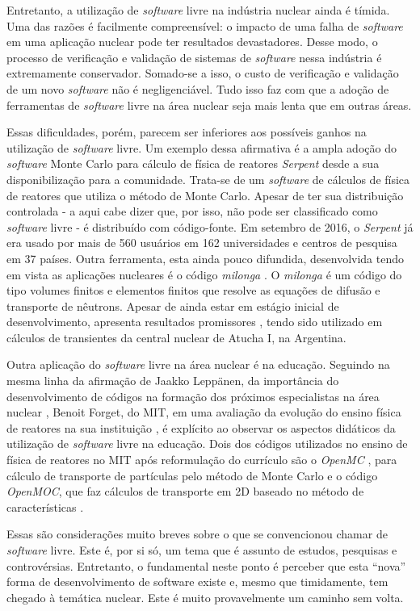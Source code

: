 Entretanto, a utilização de \textit{software} livre na indústria nuclear ainda é tímida.
Uma das razões é facilmente compreensível: o impacto de uma falha de \textit{software}
em uma aplicação nuclear pode ter resultados devastadores. Desse modo, o processo de
verificação e validação de sistemas de \textit{software} nessa indústria é extremamente
conservador. Somado-se a isso, o custo de verificação e validação de um novo \textit{software}
não é negligenciável. Tudo isso faz com que a adoção de ferramentas de \textit{software}
livre na área nuclear seja mais lenta que em outras áreas.

Essas dificuldades, porém, parecem ser inferiores aos possíveis ganhos na utilização de
\textit{software} livre. Um exemplo dessa afirmativa é a ampla adoção
do \textit{software} Monte Carlo para cálculo de física de reatores \textit{Serpent} \cite{Serpent2013}
desde a sua disponibilização para a comunidade. Trata-se de um \textit{software}
de cálculos de física de reatores que utiliza o método de Monte Carlo. Apesar
de ter sua distribuição controlada - a aqui cabe dizer que, por isso, não pode ser
classificado como \textit{software} livre - é distribuído com código-fonte. Em setembro
de 2016, o \textit{Serpent} já era usado por mais de 560 usuários em 162 universidades
e centros de pesquisa em 37 países. Outra ferramenta, esta ainda pouco difundida,
desenvolvida tendo em vista as aplicações nucleares é o código \textit{milonga} \cite{Theler2014b}.
O \textit{milonga} é um código do tipo volumes finitos e elementos finitos que resolve as equações
de difusão e transporte de nêutrons. Apesar de ainda estar em estágio inicial de
desenvolvimento, apresenta resultados promissores \cite{Theler2014}, tendo sido
utilizado em cálculos de transientes da central nuclear de Atucha I, na Argentina.

Outra aplicação do \textit{software} livre na área nuclear é na educação. Seguindo na
mesma linha da afirmação de Jaakko Leppänen, da importância do desenvolvimento de
códigos na formação dos próximos especialistas na área nuclear \cite{Leppanen2015}, Benoit
Forget, do MIT, em uma avaliação da evolução do ensino física de reatores na sua instituição \cite{Forget2014}, é explícito ao observar os aspectos didáticos da
utilização de \textit{software} livre na educação. Dois dos códigos utilizados
no ensino de física de reatores no MIT após reformulação do currículo são o \textit{OpenMC}
\cite{Romano2013}, para cálculo de transporte de partículas pelo método de Monte Carlo e
o código \textit{OpenMOC}, que faz cálculos de transporte em 2D baseado
no método de características \cite{Boyd2014}.

Essas são considerações muito breves sobre o que se convencionou chamar
de \textit{software} livre. Este é, por si só, um tema que é assunto de estudos, pesquisas
e controvérsias. Entretanto, o fundamental neste ponto é perceber que esta ``nova'' forma
de desenvolvimento de software existe e, mesmo que timidamente, tem chegado à temática
nuclear. Este é muito provavelmente um caminho sem volta.

